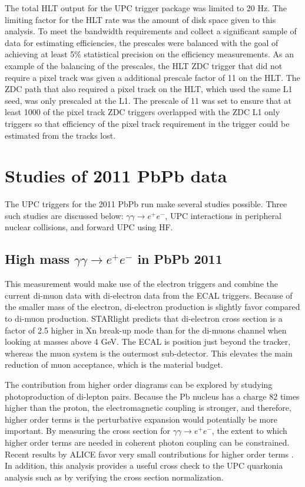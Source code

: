     The total HLT output for the UPC trigger package was limited to 20 Hz. 
    The limiting factor for the HLT rate was the amount of disk space given 
      to this analysis. 
    To meet the bandwidth requirements and collect a significant sample
      of data for estimating efficiencies, the prescales were balanced with 
      the goal of achieving at least 5\% statistical precision on the 
      efficiency measurements. 
    As an example of the balancing of the prescales, the HLT  ZDC trigger that 
      did not require a pixel track was given a additional prescale factor 
      of 11 on the HLT.
    The ZDC path that also required a pixel track on the HLT, which used 
      the same L1 seed, was only prescaled at the L1.
    The prescale of 11 was set to ensure that at least 1000 of the pixel track 
      ZDC triggers overlapped with the ZDC L1 only triggers so that efficiency
      of the pixel track requirement in the trigger could be estimated from 
      the tracks lost.

  \section{Studies of 2011 PbPb data}
    The UPC triggers for the 2011 PbPb run make several studies possible.
    Three such studies are discussed below: $\gamma\gamma \rightarrow e^{+} 
      e^{-}$, UPC interactions in peripheral nuclear collisions, and forward
      UPC \JPsi{} using HF. 

    \subsection{High mass $\gamma\gamma \rightarrow e^{+} e^{-}$  in PbPb 2011}
      This measurement would make use of the electron triggers and combine the 
        current di-muon data with di-electron data from the ECAL triggers.
      Because of the smaller mass of the electron,
        di-electron production is slightly favor compared to di-muon 
        production.
      STARlight predicts that di-electron cross section is a factor of 
        2.5 higher in Xn break-up mode than for the di-muons channel when looking 
        at masses above 4 GeV.
      The ECAL is position just beyond the tracker, whereas the muon system is 
        the outermost sub-detector. 
      This elevates the main reduction of muon acceptance, which is the material
        budget. 

      The contribution from higher order diagrams can be explored by studying 
        photoproduction of di-lepton pairs.
      Because the Pb nucleus has a charge 82 times higher than the proton,
        the electromagnetic coupling is stronger, and therefore, higher
        order terms is the perturbative expansion would potentially be more 
        important.
      By measuring the cross section for $\gamma\gamma \rightarrow e^{+} e^{-}$,
        the extent to which higher order terms are needed in coherent photon
        coupling can be constrained. 
      Recent results by ALICE favor very small contributions for higher order
        terms \cite{}.
      In addition, this analysis provides a useful cross check to the UPC 
        quarkonia analysis such as \JPsi{} by verifying the cross section 
        normalization.

